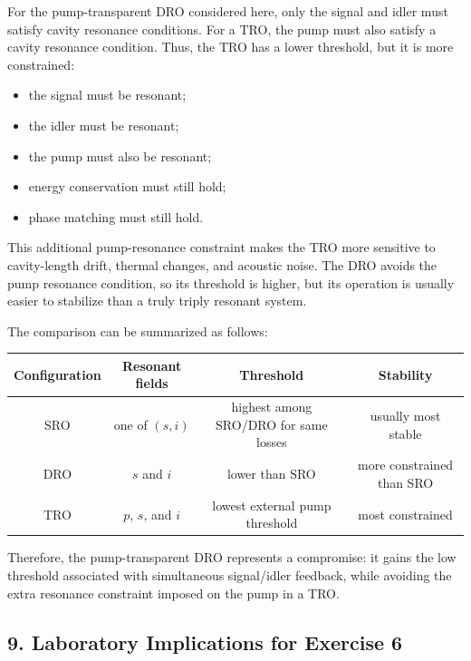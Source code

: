 \begin{resolucao}[Solution]
    For the pump-transparent DRO considered here, only the signal and idler must satisfy cavity resonance conditions. For a TRO, the pump must also satisfy a cavity resonance condition. Thus, the TRO has a lower threshold, but it is more constrained:
    \begin{itemize}
        \item the signal must be resonant;
        \item the idler must be resonant;
        \item the pump must also be resonant;
        \item energy conservation must still hold;
        \item phase matching must still hold.
    \end{itemize}
    This additional pump-resonance constraint makes the TRO more sensitive to cavity-length drift, thermal changes, and acoustic noise. The DRO avoids the pump resonance condition, so its threshold is higher, but its operation is usually easier to stabilize than a truly triply resonant system.

    The comparison can be summarized as follows:
    \begin{center}
    \begin{tabular}{c|c|c|c}
        Configuration
        &
        Resonant fields
        &
        Threshold
        &
        Stability
        \\
        \hline
        SRO
        &
        one of $(s,i)$
        &
        highest among SRO/DRO for same losses
        &
        usually most stable
        \\
        DRO
        &
        $s$ and $i$
        &
        lower than SRO
        &
        more constrained than SRO
        \\
        TRO
        &
        $p$, $s$, and $i$
        &
        lowest external pump threshold
        &
        most constrained
    \end{tabular}
    \end{center}

    Therefore, the pump-transparent DRO represents a compromise: it gains the low threshold associated with simultaneous signal/idler feedback, while avoiding the extra resonance constraint imposed on the pump in a TRO.

\subsection*{9. Laboratory Implications for Exercise 6}


\end{resolucao}

